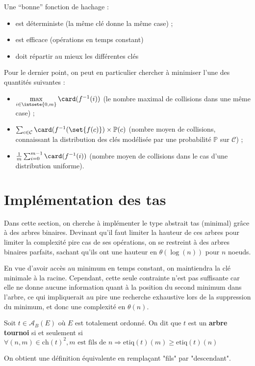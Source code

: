 \documentclass{scrartcl}
\begin{document}
		Une “bonne” fonction de hachage :
		\begin{itemize}
			\item est déterministe (la même clé donne la même case) ;
			\item est efficace (opérations en temps constant)
			\item doit répartir au mieux les différentes clés
		\end{itemize}
		Pour le dernier point, on peut en particulier chercher à minimiser l’une des quantités suivantes :
		\begin{itemize}
			\item $\mathop{\max}\limits_{i \in \intsete{0,m}} \card(f^{-1}({i}))$ (le nombre maximal de collisions dans une même case) ;
			\item $\sum_{c \in \mathcal{C} } \card(f^{-1}(\set{f(c)}) \times \mathbb{P}(c)$ (nombre moyen de collisions, connaissant la distribution des clés modélisée par une probabilité $\mathbb{P}$ sur $\mathcal{C}$) ;
			\item $\frac{1}{m}\sum_{i=0}^{m-1} \card(f^{-1}(i))$ (nombre moyen de collisions dans le cas d’une distribution uniforme).
		\end{itemize}

	\section{Implémentation des tas}
		Dans cette section, on cherche à implémenter le type abstrait tas (minimal) grâce à des arbres binaires. Devinant qu’il faut limiter la hauteur de ces arbres pour limiter la complexité pire cas de ses opérations, on se restreint à des arbres binaires parfaits, sachant qu’ils ont une hauteur en $\theta(\log(n))$ pour $n$ noeuds.

		En vue d’avoir accès au minimum en temps constant, on maintiendra la clé minimale à la racine. Cependant, cette seule contrainte n’est pas suffisante car elle ne donne aucune information quant à la position du second minimum dans l’arbre, ce qui impliquerait au pire une recherche exhaustive lors de la suppression du minimum, et donc une complexité en $\theta(n)$. 		

		Soit $t \in \mathscr{A}_B(E)$ où $E$ est totalement ordonné. On dit que $t$ est un \textbf{arbre tournoi} si et seulement si
		$\forall (n, m) \in \mathrm{ch}(t)^2, m \text{ est fils de } n \Rightarrow  \mathrm{etiq}(t)(m) \geq \mathrm{etiq}(t)(n)$
		
		\rem On obtient une définition équivalente en remplaçant "fils" par "descendant".
\end{document}
